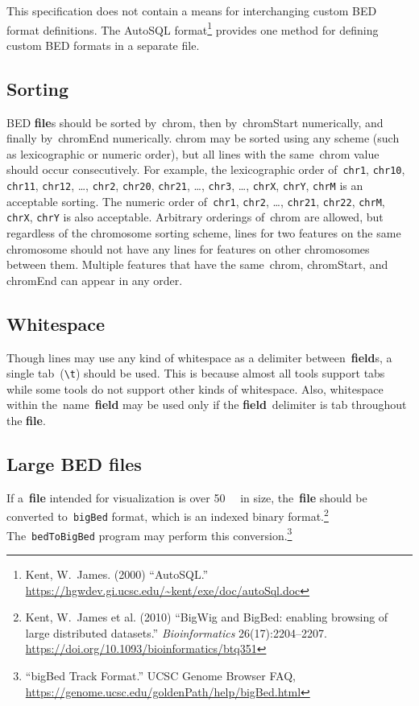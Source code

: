 \documentclass[11pt]{article}
\providecommand*{\Ac}[1]{\ac{#1}} %
\begin{document}
This specification does not contain a means for interchanging custom \ac{BED} format definitions.
The AutoSQL format\footnote{Kent, W.~James.
  (2000) ``AutoSQL.''
  \url{https://hgwdev.gi.ucsc.edu/~kent/exe/doc/autoSql.doc}} provides one method for defining custom \ac{BED} formats in a separate file.

\subsection{Sorting}
\Ac{BED} \textbf{file}s should be sorted by~\textsf{chrom}, then by~\textsf{chromStart} numerically, and finally by~\textsf{chromEnd} numerically.
\textsf{chrom} may be sorted using any scheme (such as lexicographic or numeric order), but all lines with the same~\textsf{chrom} value should occur consecutively.
For example, the lexicographic order of~\texttt{chr1}, \texttt{chr10}, \texttt{chr11}, \texttt{chr12}, {\ldots}, \texttt{chr2}, \texttt{chr20}, \texttt{chr21}, {\ldots}, \texttt{chr3}, {\ldots}, \texttt{chrX}, \texttt{chrY}, \texttt{chrM} is an acceptable sorting.
The numeric order of~\texttt{chr1}, \texttt{chr2}, {\ldots}, \texttt{chr21}, \texttt{chr22}, \texttt{chrM}, \texttt{chrX}, \texttt{chrY} is also acceptable.
Arbitrary orderings of~\textsf{chrom} are allowed, but regardless of the chromosome sorting scheme, lines for two features on the same chromosome should not have any lines for features on other chromosomes between them.
Multiple features that have the same~\textsf{chrom}, \textsf{chromStart}, and \textsf{chromEnd} can appear in any order.

\subsection{Whitespace}\label{sec:whitespace}
Though lines may use any kind of whitespace as a delimiter between~\textbf{field}s, a single tab~(\texttt{{\textbackslash}t}) should be used.
This is because almost all tools support tabs while some tools do not support other kinds of whitespace.
Also, whitespace within the~\textsf{name}~\textbf{field} may be used only if the \textbf{field}~delimiter is tab throughout the \textbf{file}.

\subsection{Large \acs{BED} files}
If a~\textbf{file} intended for visualization is over \SI{50}{\mebi\byte} in size, the~\textbf{file} should be converted to~\texttt{bigBed} format, which is an indexed binary format.\footnote{Kent, W.~James et al.
  (2010) ``BigWig and BigBed: enabling browsing of large distributed datasets.''
  \emph{Bioinformatics} 26(17):2204--2207.
  \url{https://doi.org/10.1093/bioinformatics/btq351}}
The~\texttt{bedToBigBed} program may perform this conversion.\footnote{``bigBed Track Format.''
  \Ac{UCSC} Genome Browser FAQ, \url{https://genome.ucsc.edu/goldenPath/help/bigBed.html}}
\end{document}
